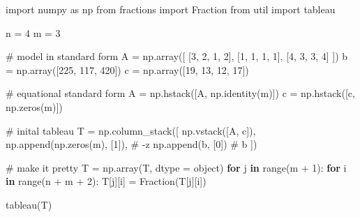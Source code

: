 \documentclass[
  letterpaper,
  DIV=11,
  numbers=noendperiod]{scrartcl}
\newenvironment{Shaded}{\begin{snugshade}}{\end{snugshade}}
\newcommand{\BuiltInTok}[1]{\textcolor[rgb]{0.00,0.23,0.31}{#1}}
\newcommand{\CommentTok}[1]{\textcolor[rgb]{0.37,0.37,0.37}{#1}}
\newcommand{\ControlFlowTok}[1]{\textcolor[rgb]{0.00,0.23,0.31}{\textbf{#1}}}
\newcommand{\DecValTok}[1]{\textcolor[rgb]{0.68,0.00,0.00}{#1}}
\newcommand{\ImportTok}[1]{\textcolor[rgb]{0.00,0.46,0.62}{#1}}
\newcommand{\KeywordTok}[1]{\textcolor[rgb]{0.00,0.23,0.31}{\textbf{#1}}}
\newcommand{\NormalTok}[1]{\textcolor[rgb]{0.00,0.23,0.31}{#1}}
\newcommand{\OperatorTok}[1]{\textcolor[rgb]{0.37,0.37,0.37}{#1}}
\begin{document}
\begin{Shaded}
\begin{Highlighting}[]
\ImportTok{import}\NormalTok{ numpy }\ImportTok{as}\NormalTok{ np}
\ImportTok{from}\NormalTok{ fractions }\ImportTok{import}\NormalTok{ Fraction}
\ImportTok{from}\NormalTok{ util }\ImportTok{import}\NormalTok{ tableau}

\NormalTok{n }\OperatorTok{=} \DecValTok{4}
\NormalTok{m }\OperatorTok{=} \DecValTok{3}

\CommentTok{\# model in standard form}
\NormalTok{A }\OperatorTok{=}\NormalTok{ np.array([}
\NormalTok{    [}\DecValTok{3}\NormalTok{, }\DecValTok{2}\NormalTok{, }\DecValTok{1}\NormalTok{, }\DecValTok{2}\NormalTok{],}
\NormalTok{    [}\DecValTok{1}\NormalTok{, }\DecValTok{1}\NormalTok{, }\DecValTok{1}\NormalTok{, }\DecValTok{1}\NormalTok{],}
\NormalTok{    [}\DecValTok{4}\NormalTok{, }\DecValTok{3}\NormalTok{, }\DecValTok{3}\NormalTok{, }\DecValTok{4}\NormalTok{]}
\NormalTok{])}
\NormalTok{b }\OperatorTok{=}\NormalTok{ np.array([}\DecValTok{225}\NormalTok{, }\DecValTok{117}\NormalTok{, }\DecValTok{420}\NormalTok{])}
\NormalTok{c }\OperatorTok{=}\NormalTok{ np.array([}\DecValTok{19}\NormalTok{, }\DecValTok{13}\NormalTok{, }\DecValTok{12}\NormalTok{, }\DecValTok{17}\NormalTok{])}

\CommentTok{\# equational standard form}
\NormalTok{A }\OperatorTok{=}\NormalTok{ np.hstack([A, np.identity(m)])}
\NormalTok{c }\OperatorTok{=}\NormalTok{ np.hstack([c, np.zeros(m)])}

\CommentTok{\# inital tableau}
\NormalTok{T }\OperatorTok{=}\NormalTok{ np.column\_stack([}
\NormalTok{    np.vstack([A, c]),}
\NormalTok{    np.append(np.zeros(m), [}\DecValTok{1}\NormalTok{]), }\CommentTok{\# {-}z}
\NormalTok{    np.append(b, [}\DecValTok{0}\NormalTok{]) }\CommentTok{\# b}
\NormalTok{])}

\CommentTok{\# make it pretty}
\NormalTok{T }\OperatorTok{=}\NormalTok{ np.array(T, dtype }\OperatorTok{=} \BuiltInTok{object}\NormalTok{)}
\ControlFlowTok{for}\NormalTok{ j }\KeywordTok{in} \BuiltInTok{range}\NormalTok{(m }\OperatorTok{+} \DecValTok{1}\NormalTok{):}
    \ControlFlowTok{for}\NormalTok{ i }\KeywordTok{in} \BuiltInTok{range}\NormalTok{(n }\OperatorTok{+}\NormalTok{ m }\OperatorTok{+} \DecValTok{2}\NormalTok{):}
\NormalTok{        T[j][i] }\OperatorTok{=}\NormalTok{ Fraction(T[j][i])}

\NormalTok{tableau(T)}
\end{Highlighting}
\end{Shaded}
\end{document}
